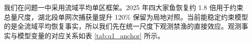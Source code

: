 我们在问题一中采用流域平均单区框架。2025 年四大家鱼恢复约 1.8 倍用于约束总量尺度，湖北段单网次捕获量提升 120\% 保留为局地对照。当前能稳定约束模型的是全流域平均恢复事实，所以我们先在统一尺度下观测禁渔的直接效应。观测事实与模型变量的对应关系如表 \ref{tab:q1_anchor} 所示。
